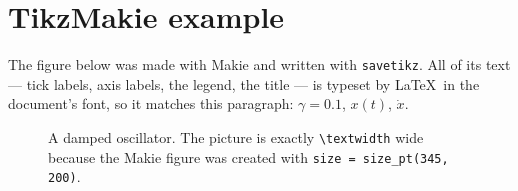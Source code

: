 \documentclass[10pt]{article}
\begin{document}
\section*{TikzMakie example}

The figure below was made with Makie and written with \texttt{savetikz}.
All of its text --- tick labels, axis labels, the legend, the title --- is
typeset by \LaTeX\ in the document's font, so it matches this paragraph:
$\gamma = 0.1$, $x(t)$, $\dot{x}$.

\begin{figure}[h]
  \centering
  
  \caption{A damped oscillator. The picture is exactly \texttt{\textbackslash textwidth} wide
    because the Makie figure was created with \texttt{size = size\_pt(345, 200)}.}
\end{figure}

\lipsum[1]
\end{document}
